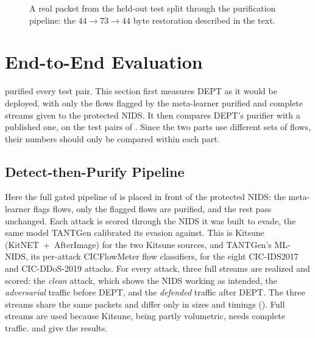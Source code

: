 \begin{figure}[t]
    \centering
    
    \caption[A single real packet through the purification pipeline.]{A real packet
    from the held-out test split through the purification pipeline: the
    $44 \rightarrow 73 \rightarrow 44$ byte restoration described in the text.}
    \label{fig:eval-purifpacket}
\end{figure}

\section{End-to-End Evaluation}\label{sec:eval-e2e}

 purified every test pair. This section first measures DEPT
as it would be deployed, with only the flows flagged by the meta-learner purified and
complete streams given to the protected \ac{NIDS}. It then compares DEPT's purifier with
a published one, on the test pairs of . Since the two parts
use different sets of flows, their numbers should only be compared within each part.

\subsection{Detect-then-Purify Pipeline}\label{subsec:eval-e2e-detect}

Here the full gated pipeline of  is placed in front of the
protected \ac{NIDS}: the meta-learner flags flows, only the flagged flows are purified,
and the rest pass unchanged. Each attack is scored through the \ac{NIDS} it was built to
evade, the same model TANTGen calibrated its evasion against. This is Kitsune
(KitNET~+~AfterImage) for the two Kitsune sources, and TANTGen's ML-NIDS, its per-attack
CICFlowMeter flow classifiers, for the eight CIC-IDS2017 and CIC-DDoS-2019 attacks. For
every attack, three full streams are realized and scored: the \emph{clean} attack, which
shows the \ac{NIDS} working as intended, the \emph{adversarial} traffic before DEPT, and
the \emph{defended} traffic after DEPT. The three streams share the same packets and
differ only in sizes and timings (). Full streams are used
because Kitsune, being partly volumetric, needs complete traffic. 
and  give the results.

